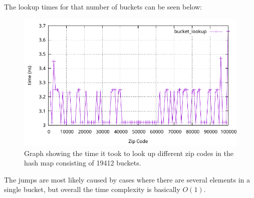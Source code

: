 \documentclass[a4paper, 11pt]{article}
\begin{document}
	The lookup times for that number of buckets can be seen below:
	\begin{figure}[H]
		\centering
		\includegraphics[scale=0.8]{graphs/bucket_lookup.pdf}
		\caption{
			Graph showing the time it took to look up different zip codes in the hash map consisting of 19412 buckets.
		}
	\end{figure}
	The jumps are most likely caused by cases where there are several elements in a single bucket, but overall the time complexity is basically \(O(1)\).
\end{document}
